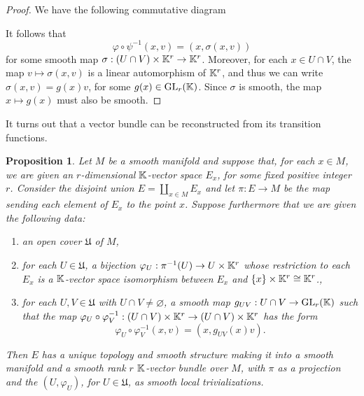 \documentclass[11pt,a4paper]{book}
\newtheorem{prop}[thm]{Proposition}
\theoremstyle{remark} \newtheorem{rmk}[thm]{Remark}
\theoremstyle{definition} \newtheorem{defn}[thm]{Definition}
\theoremstyle{definition} \newtheorem{ex}[thm]{Example}
\theoremstyle{definition} \newtheorem{ej}[thm]{Exercise}
\begin{document}
\begin{proof}
We have the following commutative diagram
\begin{center}
\end{center}
It follows that
\begin{equation*}
\varphi \circ \psi^{-1}(x,v) = (x,\sigma(x,v))
\end{equation*}
for some smooth map $\sigma: (U\cap V) \times \mathbb K^r \rightarrow \mathbb K^r$. Moreover, for each $x\in U\cap V$, the map $v \mapsto \sigma(x,v)$ is a linear automorphism of $\mathbb K^r$, and thus we can write $\sigma(x,v)=g(x) v$, for some $g(x) \in \operatorname{GL}_r(\mathbb K)$. Since $\sigma$ is smooth, the map $x \mapsto g(x)$ must also be smooth.
\end{proof}

It turns out that a vector bundle can be reconstructed from its transition functions.

\begin{prop}
  Let $M$ be a smooth manifold and suppose that, for each $x\in M$, we are given an $r$-dimensional $\mathbb K$-vector space $E_x$, for some fixed positive integer $r$. Consider the disjoint union $E=\coprod_{x\in M} E_x$ and let $\pi:E\rightarrow M$ be the map sending each element of $E_x$ to the point $x$. Suppose furthermore that we are given the following data:
  \begin{enumerate}
    \item an open cover $\mathfrak{U}$ of $M$,
          \item for each $U\in \mathfrak{U}$, a bijection $\varphi_U:\pi^{-1}(U)\rightarrow U \times \mathbb K^r$ whose restriction to each $E_x$ is a $\mathbb K$-vector space isomorphism between $E_x$ and $\left\{ x \right\}\times \mathbb K^r \cong \mathbb K^r$.,
          \item for each $U,V \in \mathfrak{U}$ with $U\cap V\neq \varnothing$, a smooth map $g_{UV}:U\cap V \rightarrow \operatorname{GL}_r(\mathbb K)$ such that the map $\varphi_U \circ \varphi_V^{-1}:(U\cap V)\times \mathbb K^r\rightarrow (U\cap V)\times \mathbb K^r$ has the form
          \begin{equation*}
\varphi_U \circ \varphi_V^{-1}(x,v) = (x,g_{UV}(x) v).
          \end{equation*}
  \end{enumerate}
  Then $E$ has a unique topology and smooth structure making it into a smooth manifold and a smooth rank $r$ $\mathbb K$-vector bundle over $M$, with $\pi$ as a projection and the $(U,\varphi_U)$, for $U\in \mathfrak{U}$, as smooth local trivializations.
\end{prop}
\end{document}
